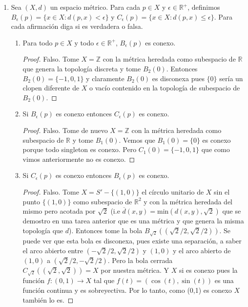 \documentclass[letter,twoside,12pt]{article}
\begin{document}
\begin{enumerate}
\begin{proof}
Por lo tanto llegamos a una contradicción con la conexidad de $ Y $. Entonces $X$ debe ser conexo.


\end{proof}

\item Sea $ (X,d) $ un espacio métrico. Para cada $ p \in X $ y $ \epsilon \in \mathbb{R}^+ $, definimos $ B_\epsilon(p) = \{x \in X:d(p,x)<\epsilon \}$ y $ C_\epsilon(p)= \{x \in X:d(p,x)\leq \epsilon\} $. Para cada afirmación diga si es verdadera o falsa.

\begin{enumerate}[label=(\alph*)]
\item Para todo $ p \in X $ y todo $ \epsilon \in \mathbb{R}^+ $, $ B_{\epsilon}(p) $ es conexo.
\begin{proof}
Falso. Tome $ X = \mathbb{Z} $ con la métrica heredada como subespacio de $ \mathbb{R} $ que genera la topología discreta y tome $B_2(0)$. Entonces $B_2(0)=\{-1,0,1\}$ y claramente $B_2(0)$ es disconexa pues $ \{0\} $ sería un clopen diferente de $X$ o vacío contenido en la topología de subespacio de $B_2(0)$.
\end{proof}
\item Si $ B_\epsilon(p) $ es conexo entonces $ C_\epsilon(p) $ es conexo.

\begin{proof}
Falso. Tome de nuevo $X = \mathbb{Z}$ con la métrica heredada como subespacio de $ \mathbb{R} $ y tome $ B_1(0) $. Vemos que $ B_1(0) = \{0\}$ es conexo porque todo singleton es conexo. Pero $ C_1(0) = \{-1,0,1\}$ que como vimos anteriormente no es conexo.  
\end{proof}

\item Si $ C_\epsilon(p) $ es conexo entonces $ B_\epsilon(p) $ es conexo.

\begin{proof}
Falso. Tome $X=S'-\{(1,0)\}$ el círculo unitario de $X$ sin el punto $ \{(1,0)\}$ como subespacio de $ \mathbb{R}^2 $ y con la métrica heredada del mismo pero acotada por $ \sqrt{2} $ (i.e $ \overline{d}(x,y)=\text{min}(d(x,y),\sqrt{2}) $ que se demostro en una tarea anterior que es una métrica y que genera la misma topología que $ d $). Entonces tome la bola $ B_{\sqrt{2}}((\sqrt{2}/2,\sqrt{2}/2)) $. Se puede ver que esta bola es disconexa, pues existe una separación, a saber el arco abierto entre $ (-\sqrt{2}/2,\sqrt{2}/2) $ y $(1,0)$ y el arco abierto de $ (1,0) $ a $ (\sqrt{2}/2,-\sqrt{2}/2) $. Pero la bola cerrada $ C_{\sqrt{2}}((\sqrt{2},\sqrt{2}))= X $ por nuestra métrica. Y $X$ si es conexo pues la función $ f:(0,1)\to X $ tal que $ f(t)=(\cos(t),\sin(t)) $ es una función continua y es sobreyectiva. Por lo tanto, como (0,1) es conexo $X$ también lo es.
\end{proof}


\end{enumerate}
\end{enumerate}
\end{document}
